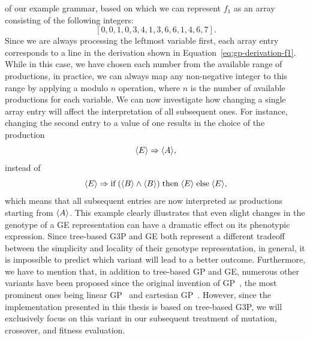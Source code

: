 of our example grammar, based on which we can represent $f_1$ as an array consisting of the following integers:
\begin{equation*}
	\left[ 0, 0, 1, 0, 3, 4, 1, 3, 6, 6, 1, 4, 6, 7 \right].
\end{equation*}
Since we are always processing the leftmost variable first, each array entry corresponds to a line in the derivation shown in Equation~\eqref{eq:gp-derivation-f1}.
While in this case, we have chosen each number from the available range of productions, in practice, we can always map any non-negative integer to this range by applying a modulo $n$ operation, where $n$ is the number of available productions for each variable.
We can now investigate how changing a single array entry will affect the interpretation of all subsequent ones.
For instance, changing the second entry to a value of one results in the choice of the production 
\begin{equation*}
	\langle E \rangle \Rightarrow \langle A \rangle,
\end{equation*}
instead of
\begin{equation*}
	\langle E \rangle \Rightarrow \text{if} \; (\langle B \rangle \wedge \langle B \rangle) \; \text{then} \; \langle E \rangle \; \text{else} \; \langle E \rangle,
\end{equation*}
which means that all subsequent entries are now interpreted as productions starting from $\langle A \rangle$.
This example clearly illustrates that even slight changes in the genotype of a GE representation can have a dramatic effect on its phenotypic expression.
Since tree-based G3P and GE both represent a different tradeoff between the simplicity and locality of their genotype representation, in general, it is impossible to predict which variant will lead to a better outcome.
Furthermore, we have to mention that, in addition to tree-based GP and GE, numerous other variants have been proposed since the original invention of GP~\cite{poli2008field}, the most prominent ones being linear GP~\cite{brameier2007linear} and cartesian GP~\cite{miller2008cartesian}. 
However, since the implementation presented in this thesis is based on tree-based G3P, we will exclusively focus on this variant in our subsequent treatment of mutation, crossover, and fitness evaluation.
